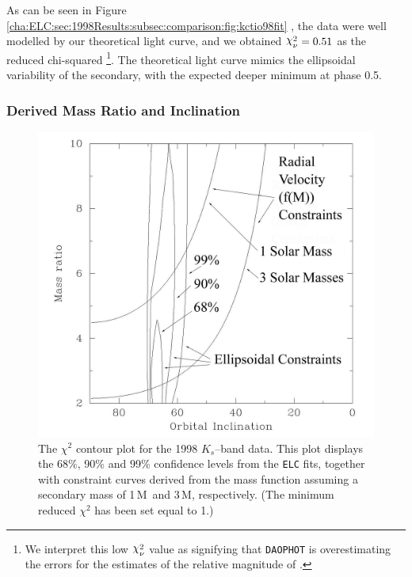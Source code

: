 As can be seen in Figure~%
\vref{cha:ELC:sec:1998Results:subsec:comparison:fig:kctio98fit}%
, the data were well modelled by our theoretical light curve, and we
obtained $\Chi_{\nu}^{2} = 0.51$ as the reduced chi-squared%
\footnote{\label{cha:ELC:sec:1998Results:foot:LowError}
We interpret this low $\Chi_{\nu}^{2}$ value as signifying that
\texttt{DAOPHOT} is overestimating the errors for the estimates of the
relative magnitude of \groj. }. %
The theoretical light curve mimics the ellipsoidal variability of the
secondary, with the expected deeper minimum at phase 0.5. %


\subsubsection{Derived Mass Ratio and Inclination}\label{cha:ELC:sec:1998Results:subsec:comparison:subsubsec:derivedQ}

\begin{figure}[!htb]
\begin{center}
\includegraphics[width=5.0in]{contourPlot2}
\caption{%
The $\chi^2$ contour plot for the 1998 $K_{s}$--band data. This plot displays the 68\%, 90\% and
 99\% confidence levels from the \texttt{ELC} fits, together with constraint curves derived from the mass function assuming a secondary mass of 1\,M\sun\ and 3\,M\sun, respectively. (The minimum reduced $\chi^2$ has been set equal to 1.) %
}\label{cha:ELC:sec:1995Results:subsec:comparison:fig:contourPlot2}
\end{center}
\end{figure}


